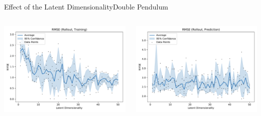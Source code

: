 \documentclass[
	aspectratio=43,
	color={accentcolor=1c},
	logo=false,
	colorframetitle=true,
	handout
]{tudabeamer}
\begin{document}
			\begin{frame}{Effect of the Latent Dimensionality}{Double Pendulum}
				\begin{columns}[c]
					\begin{column}{0.5\linewidth}
						\begin{center}
							\includegraphics[width=\linewidth]{figures/experiments/acrobot-gym/latent-dim/comparison-rmse-rollout-train-mean-vs-latent-dim.pdf}
						\end{center}
					\end{column}
					\begin{column}{0.5\linewidth}
						\begin{center}
							\includegraphics[width=\linewidth]{figures/experiments/acrobot-gym/latent-dim/comparison-rmse-rollout-prediction-mean-vs-latent-dim.pdf}
						\end{center}
					\end{column}
				\end{columns}
			\end{frame}
\end{document}
